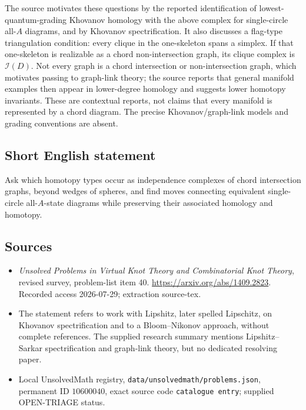 \documentclass[11pt]{article}
\begin{document}
The source motivates these questions by the reported identification of lowest-quantum-grading Khovanov homology with the above complex for single-circle all-\(A\) diagrams, and by Khovanov spectrification. It also discusses a flag-type triangulation condition: every clique in the one-skeleton spans a simplex. If that one-skeleton is realizable as a chord non-intersection graph, its clique complex is \(\mathcal I(D)\). Not every graph is a chord intersection or non-intersection graph, which motivates passing to graph-link theory; the source reports that general manifold examples then appear in lower-degree homology and suggests lower homotopy invariants. These are contextual reports, not claims that every manifold is represented by a chord diagram. The precise Khovanov/graph-link models and grading conventions are absent.
\subsection{Short English statement}
Ask which homotopy types occur as independence complexes of chord intersection graphs, beyond wedges of spheres, and find moves connecting equivalent single-circle all-\(A\)-state diagrams while preserving their associated homology and homotopy.
\subsection{Sources}
\begin{itemize}
\item \emph{Unsolved Problems in Virtual Knot Theory and Combinatorial Knot Theory}, revised survey, problem-list item 40. \url{https://arxiv.org/abs/1409.2823}. Recorded access 2026-07-29; extraction source-tex.
\item The statement refers to work with Lipshitz, later spelled Lipschitz, on Khovanov spectrification and to a Bloom--Nikonov approach, without complete references. The supplied research summary mentions Lipshitz--Sarkar spectrification and graph-link theory, but no dedicated resolving paper.
\item Local UnsolvedMath registry, \texttt{data/unsolvedmath/problems.json}, permanent ID \(10600040\), exact source code \texttt{catalogue entry}; supplied OPEN-TRIAGE status.
\end{itemize}
\end{document}
